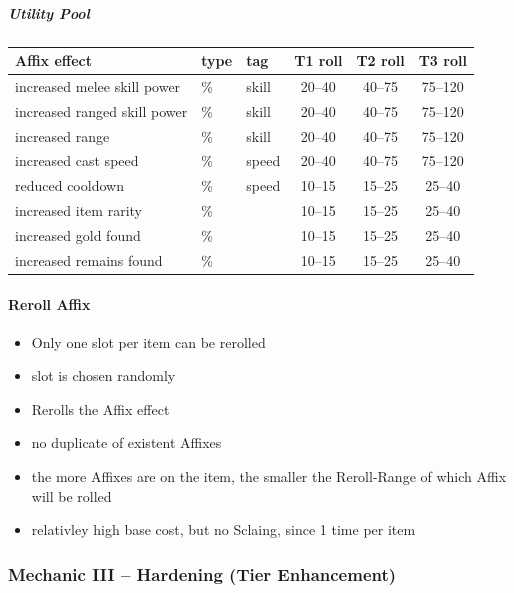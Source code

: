 \subparagraph{Utility Pool}
\begin{center}
	\begin{tabular}{|l|l|l|c c c|}
		\hline
		\textbf{Affix effect} & \textbf{type} & \textbf{tag} & \textbf{T1 roll} & \textbf{T2 roll} & \textbf{T3 roll} \\
		\hline
		increased melee skill power           & \%   & skill     & 20--40 & 40--75  & 75--120 \\
		increased ranged skill power          & \%   & skill     & 20--40 & 40--75  & 75--120 \\
		increased range                       & \%   & skill     & 20--40 & 40--75  & 75--120 \\
		\hline
		increased cast speed                  & \%   & speed     & 20--40 & 40--75  & 75--120 \\
		reduced cooldown                      & \%   & speed     & 10--15 & 15--25  & 25--40  \\
		\hline
		increased item rarity                 & \%   &    & 10--15 & 15--25  & 25--40  \\
		increased gold found                  & \%   &    & 10--15 & 15--25  & 25--40  \\
		increased remains found               & \%   &    & 10--15 & 15--25  & 25--40  \\
		\hline
	\end{tabular}
\end{center}


\paragraph{Reroll Affix}

\begin{itemize}
	\item Only one slot per item can be rerolled
	\item slot is chosen randomly
	\item Rerolls the Affix effect
	\item no duplicate of existent Affixes
	\item the more Affixes are on the item, the smaller the Reroll-Range of which Affix will be rolled
	\item relativley high base cost, but no Sclaing, since 1 time per item
\end{itemize}


\vspace{1em}
\subsubsection{Mechanic III – Hardening (Tier Enhancement)}

